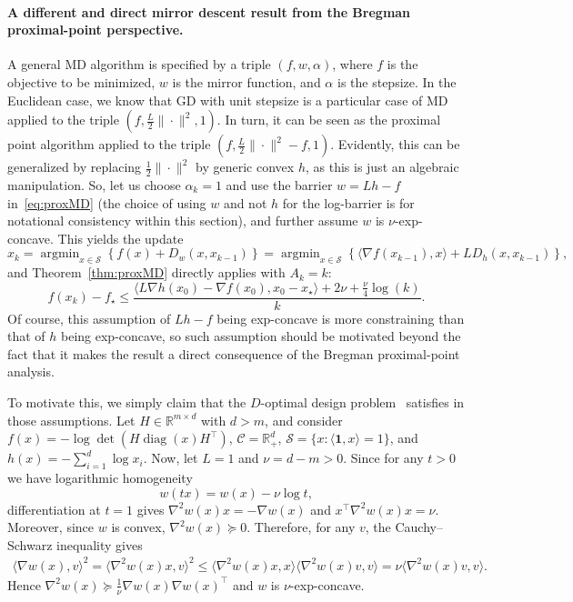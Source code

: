 \documentclass[a4paper]{article}
\renewcommand{\leq}{\leqslant}
\renewcommand{\succeq}{\succcurlyeq}
\newcommand{\CC}{\mathcal{C}}
\renewcommand{\SS}{\mathcal{S}}
\newcommand{\R}{\mathbb{R}}
\newcommand{\n}[1]{\|#1 \|}
\newcommand{\ip}[2]{\langle #1, #2\rangle}
\newcommand{\one}{\bm{1}}
\DeclareMathOperator*{\argmin}{argmin}
\DeclareMathOperator{\diag}{diag}
\begin{document}
\paragraph{A different and direct mirror descent result from the Bregman proximal-point perspective.}
A general MD algorithm is specified by a triple $(f,w,\alpha)$, where $f$ is the objective to be minimized, $w$ is the mirror function, and $\alpha$ is the stepsize.
In the Euclidean case, we know that GD with unit stepsize is a particular case of MD applied to the triple  $(f, \tfrac{L}{2}\n{\cdot}^2, 1)$.
In turn, it can be seen as the proximal point algorithm applied to the triple $(f, \tfrac{L}{2}\n{\cdot}^2 - f, 1)$.
Evidently, this can be generalized by replacing $\tfrac{1}{2}\n{\cdot}^2$ by generic convex $h$, as this is just an algebraic manipulation.
So, let us choose $\alpha_k=1$ and use the barrier $w= Lh-f$ in~\eqref{eq:proxMD} (the choice of using $w$ and not $h$ for the log-barrier is for notational consistency within this section), and further assume $w$ is $\nu$-exp-concave.
This yields the update
\begin{equation*}
        x_{k}
        = \argmin_{x\in\SS}\left\{ f(x) +  D_{w}(x,x_{k-1})\right\}
        = \argmin_{x\in\SS}\left\{ \ip{\nabla f(x_{k-1})}{ x} +  L D_h(x,x_{k-1})\right\},
\end{equation*}
and Theorem~\ref{thm:proxMD} directly applies with $A_k=k$:
\[
        f(x_k)-f_\star
        \leq
        \frac{\ip{L\nabla h(x_0)-\nabla f(x_0)}{ x_0-x_\star} +2\nu +\tfrac{\nu}{4}\log(k)}{k}.
\]
Of course, this assumption of $Lh-f$ being exp-concave is more constraining than that of $h$ being exp-concave, so such assumption should be motivated beyond the fact that it makes the result a direct consequence of the Bregman proximal-point analysis.

To motivate this, we simply claim that the $D$-optimal design problem~\cite[Section 2.2]{lu2017} satisfies in those assumptions.
Let $H\in \R^{m\times d}$ with $d>m$, and consider $f(x) = -\log \det(H\diag(x)H^\top)$, $\CC = \R_{+}^d$, $\SS = \{x\colon \ip{\one}{x} = 1\}$, and $h(x)=-\sum_{i=1}^d\log x_i$.
Now, let $L=1$ and $\nu=d-m>0$.
Since for any $t>0$ we have logarithmic homogeneity
\begin{equation*}
w(tx)=w(x)-\nu\log t,
\end{equation*}
differentiation at $t=1$ gives $\nabla^2 w(x)x=-\nabla w(x)$ and $x^\top\nabla^2 w(x)x=\nu$. Moreover, since $w$ is convex,  $\nabla^2w(x)\succeq0$.
Therefore, for any $v$, the Cauchy--Schwarz inequality gives
\begin{align*}
\ip{\nabla w(x)}{v}^2
=
\ip{ \nabla^2 w(x) x}{v}^2 
\leq
\ip{ \nabla^2 w(x) x}{x}
\ip{ \nabla^2 w(x) v}{v}
=
\nu \ip{ \nabla^2 w(x) v}{v}.
\end{align*}
Hence $\nabla^2w(x)\succeq \tfrac{1}{\nu}\nabla w(x)\nabla w(x)^\top$ and $w$ is $\nu$-exp-concave. 
\end{document}
